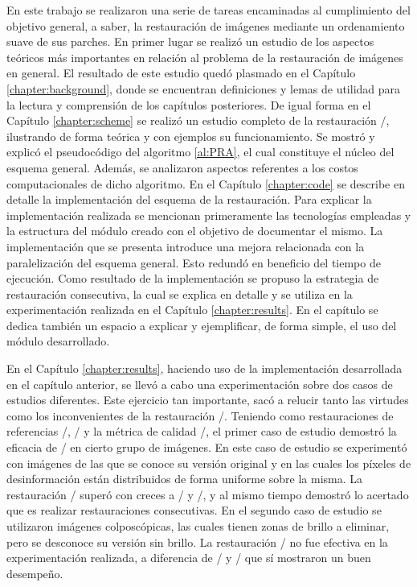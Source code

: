 \begin{conclusions}\label{chapter:conclusions}

En este trabajo se realizaron una serie de tareas encaminadas al cumplimiento del objetivo general, a saber, la restauración de imágenes mediante un ordenamiento suave de sus parches. En primer lugar se realiz\'o un estudio de los aspectos te\'oricos m\'as importantes en relaci\'on al problema de la restauraci\'on de im\'agenes en general. El resultado de este estudio qued\'o plasmado en el Cap\'itulo \ref{chapter:background}, donde se encuentran definiciones y lemas de utilidad para la lectura y comprensión de los cap\'itulos posteriores. De igual forma en el Cap\'itulo \ref{chapter:scheme} se realiz\'o un estudio completo de la restauraci\'on \SOP/, ilustrando de forma te\'orica y con ejemplos su funcionamiento. Se mostr\'o y explic\'o el pseudoc\'odigo del algoritmo \ref{al:PRA}, el cual constituye el n\'ucleo del esquema general. Adem\'as, se analizaron aspectos referentes a los costos computacionales de dicho algoritmo. En el Cap\'itulo \ref{chapter:code} se describe en detalle la implementaci\'on del esquema de la restauraci\'on. Para explicar la implementación realizada se mencionan primeramente las tecnologías empleadas y la estructura del módulo creado  con el objetivo de documentar el mismo. La implementación que se presenta introduce una mejora relacionada con la paralelización del esquema general. Esto redundó en beneficio del tiempo de ejecución. Como resultado de la implementación se propuso la estrategia de restauración consecutiva, la cual se explica en detalle y se utiliza en la experimentación realizada en el Capítulo \ref{chapter:results}. En el capítulo se dedica también un espacio a explicar  y ejemplificar, de forma simple, el uso del módulo desarrollado.

En el Cap\'itulo \ref{chapter:results}, haciendo uso de la implementaci\'on desarrollada en el cap\'itulo anterior, se llev\'o a cabo una experimentaci\'on sobre dos casos de estudios diferentes. Este ejercicio tan importante, sac\'o a relucir tanto las virtudes como los inconvenientes de la restauraci\'on \SOP/. Teniendo como restauraciones de referencias \TELEA/, \NS/ y la m\'etrica de calidad \PSNR/, el primer caso de estudio demostr\'o la eficacia de \SOP/ en cierto grupo de im\'agenes. En este caso de estudio se experiment\'o con im\'agenes de las que se conoce su versión original y en las cuales los p\'ixeles de desinformaci\'on est\'an distribuidos de forma uniforme sobre la misma. La restauraci\'on \SOP/ super\'o con creces a \TELEA/ y \NS/, y al mismo tiempo demostr\'o lo acertado que es realizar restauraciones consecutivas. En el segundo caso de estudio se utilizaron im\'agenes colposc\'opicas, las cuales tienen zonas de brillo a eliminar, pero se desconoce su versi\'on sin brillo. La restauraci\'on \SOP/ no fue efectiva en la experimentación realizada, a diferencia de \TELEA/ y \NS/ que s\'i mostraron un buen desempeño. 


\end{conclusions}
